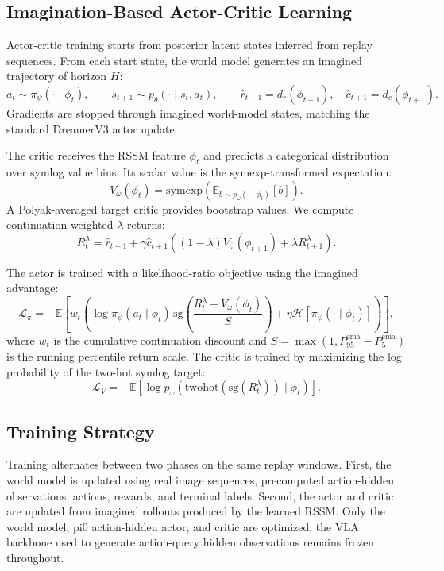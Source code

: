 \subsection{Imagination-Based Actor-Critic Learning}

Actor-critic training starts from posterior latent states inferred from replay sequences. From each start state, the world model generates an imagined trajectory of horizon $H$:
\[
a_t \sim \pi_\psi(\cdot \mid \phi_t),
\qquad
s_{t+1} \sim p_\theta(\cdot \mid s_t,a_t),
\qquad
\hat{r}_{t+1}=d_r(\phi_{t+1}), \quad
\hat{c}_{t+1}=d_c(\phi_{t+1}).
\]
Gradients are stopped through imagined world-model states, matching the standard DreamerV3 actor update.

The critic receives the RSSM feature $\phi_t$ and predicts a categorical distribution over symlog value bins. Its scalar value is the symexp-transformed expectation:
\[
V_\omega(\phi_t)=\mathrm{symexp}\left(\mathbb{E}_{b\sim p_\omega(\cdot\mid \phi_t)}[b]\right).
\]
A Polyak-averaged target critic provides bootstrap values. We compute continuation-weighted $\lambda$-returns:
\[
R_t^\lambda =
\hat{r}_{t+1}
+ \gamma \hat{c}_{t+1}
\left((1-\lambda)V_{\bar{\omega}}(\phi_{t+1})
+ \lambda R_{t+1}^{\lambda}\right).
\]

The actor is trained with a likelihood-ratio objective using the imagined advantage:
\[
\mathcal{L}_{\pi}
=
-
\mathbb{E}\left[
w_t
\left(
\log \pi_\psi(a_t\mid \phi_t)\,
\mathrm{sg}\left(\frac{R_t^\lambda - V_\omega(\phi_t)}{S}\right)
+ \eta \mathcal{H}[\pi_\psi(\cdot\mid \phi_t)]
\right)
\right],
\]
where $w_t$ is the cumulative continuation discount and $S=\max(1,P_{95}^{\text{ema}}-P_{5}^{\text{ema}})$ is the running percentile return scale. The critic is trained by maximizing the log probability of the two-hot symlog target:
\[
\mathcal{L}_{V}
=
-
\mathbb{E}\left[
\log p_\omega\left(\mathrm{twohot}(\mathrm{sg}(R_t^\lambda)) \mid \phi_t\right)
\right].
\]

\subsection{Training Strategy}

Training alternates between two phases on the same replay windows. First, the world model is updated using real image sequences, precomputed action-hidden observations, actions, rewards, and terminal labels. Second, the actor and critic are updated from imagined rollouts produced by the learned RSSM. Only the world model, pi0 action-hidden actor, and critic are optimized; the VLA backbone used to generate action-query hidden observations remains frozen throughout.
